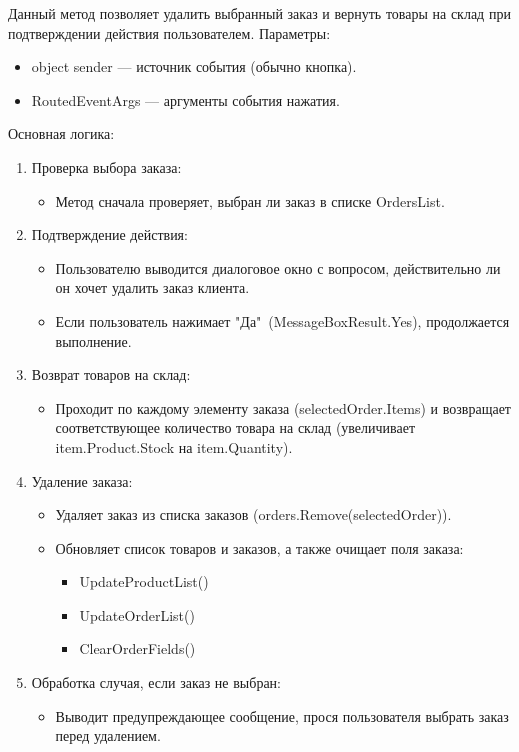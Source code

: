 \documentclass[12pt]{article}
\renewcommand{\texttt}[1]{{\small\ttfamily #1}}
\numberwithin{listing}{section}
\numberwithin{figure}{section}
\begin{document}
Данный метод позволяет удалить выбранный заказ и вернуть товары на склад при подтверждении действия пользователем.
Параметры:
\begin{itemize}
	\item \texttt{object sender} — источник события (обычно кнопка).
	\item \texttt{RoutedEventArgs} — аргументы события нажатия.
\end{itemize}
Основная логика:
\begin{enumerate}
	\item Проверка выбора заказа:
	      \begin{itemize}
		      \item Метод сначала проверяет, выбран ли заказ в списке \texttt{OrdersList}.
	      \end{itemize}
	\item Подтверждение действия:
	      \begin{itemize}
		      \item Пользователю выводится диалоговое окно с вопросом, действительно ли он хочет удалить заказ клиента.
		      \item Если пользователь нажимает "Да"\ (\texttt{MessageBoxResult.Yes}), продолжается выполнение.
	      \end{itemize}
	\item Возврат товаров на склад:
	      \begin{itemize}
		      \item Проходит по каждому элементу заказа (\texttt{selectedOrder.Items}) и возвращает соответствующее количество товара на склад (увеличивает \texttt{item.Product.Stock} на \texttt{item.Quantity}).
	      \end{itemize}
	\item Удаление заказа:
	      \begin{itemize}
		      \item Удаляет заказ из списка заказов (\texttt{orders.Remove(selectedOrder)}).
		      \item Обновляет список товаров и заказов, а также очищает поля заказа:
		            \begin{itemize}
			            \item \texttt{UpdateProductList()}
			            \item \texttt{UpdateOrderList()}
			            \item \texttt{ClearOrderFields()}
		            \end{itemize}
	      \end{itemize}
	\item Обработка случая, если заказ не выбран:
	      \begin{itemize}
		      \item Выводит предупреждающее сообщение, прося пользователя выбрать заказ перед удалением.
	      \end{itemize}

\end{enumerate}
\end{document}
